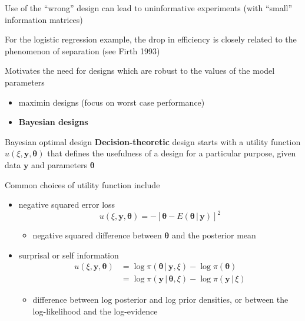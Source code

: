 \documentclass[
  ignorenonframetext,
]{beamer}
\providecommand{\tightlist}{%
  \setlength{\itemsep}{0pt}\setlength{\parskip}{0pt}}
\begin{document}
\begin{frame}{}
\protect\hypertarget{section-28}{}
Use of the ``wrong'' design can lead to uninformative experiments (with
``small'' information matrices)

For the logistic regression example, the drop in efficiency is closely
related to the phenomenon of separation (see Firth 1993)

Motivates the need for designs which are robust to the values of the
model parameters

\begin{itemize}
\tightlist
\item
  maximin designs (focus on worst case performance)
\item
  \textbf{Bayesian designs}
\end{itemize}
\end{frame}

\begin{frame}{Bayesian optimal design}
\protect\hypertarget{bayesian-optimal-design-1}{}
\textbf{Decision-theoretic} design starts with a utility function
\(u(\xi,\boldsymbol{y},\boldsymbol{\theta})\) that defines the
usefulness of a design for a particular purpose, given data
\(\boldsymbol{y}\) and parameters \(\boldsymbol{\theta}\)

Common choices of utility function include

\begin{itemize}
\tightlist
\item
  negative squared error loss
  \[u(\xi, \boldsymbol{y}, \boldsymbol{\theta}) = -\left[\boldsymbol{\theta}- E(\boldsymbol{\theta}\,|\,\boldsymbol{y})\right]^2\]

  \begin{itemize}
  \tightlist
  \item
    negative squared difference between \(\boldsymbol{\theta}\) and the
    posterior mean
  \end{itemize}
\item
  surprisal or self information \[
    \begin{split}
    u(\xi, \boldsymbol{y}, \boldsymbol{\theta}) & = \log \pi(\boldsymbol{\theta}\,|\,\boldsymbol{y},\xi) - \log \pi(\boldsymbol{\theta}) \\
    & = \log \pi(\boldsymbol{y}\,|\,\boldsymbol{\theta},\xi) - \log \pi(\boldsymbol{y}\,|\,\xi)
    \end{split}
    \]

  \begin{itemize}
  \tightlist
  \item
    difference between log posterior and log prior densities, or between
    the log-likelihood and the log-evidence
  \end{itemize}
\end{itemize}
\end{frame}
\end{document}
